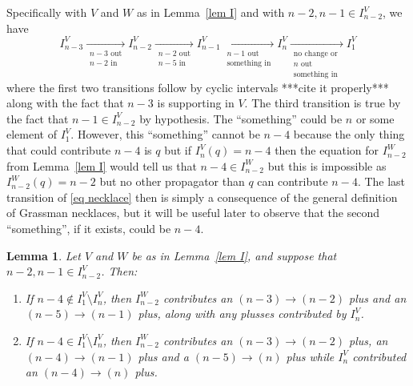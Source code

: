\documentclass[11pt]{article}
\newtheorem{lem}[thm]{Lemma}
\theoremstyle{remark}
\theoremstyle{definition}
\begin{document}
Specifically with $V$ and $W$ as in Lemma~\ref{lem I} and with $n-2, n-1\in I_{n-2}^V$, we have
  \begin{equation}\label{eq necklace}
  I_{n-3}^{V} \xrightarrow[\substack{n-3\text{ out}\\n-2\text{ in}}]{} I_{n-2}^{V} \xrightarrow[\substack{n-2\text{ out}\\n-5\text{ in}}]{} I_{n-1}^{V} \xrightarrow[\substack{n-1\text{ out}\\\text{something in}}]{} I_{n}^{V}  \xrightarrow[\substack{\text{no change or }\\n \text{ out}\\\text{something in}}]{} I_1^{V}
  \end{equation}
  where the first two transitions follow by cyclic intervals ***cite it properly*** along with the fact that $n-3$ is supporting in $V$.  The third transition is true by the fact that $n-1\in I_{n-2}^V$ by hypothesis.  The ``something'' could be $n$ or some element of $I_1^V$.  However, this ``something'' cannot be $n-4$ because the only thing that could contribute $n-4$ is $q$ but if $I_n^V(q)=n-4$ then the equation for $I_{n-2}^W$ from Lemma~\ref{lem I} would tell us that $n-4\in I_{n-2}^W$ but this is impossible as $I_{n-2}^W(q)=n-2$ but no other propagator than $q$ can contribute $n-4$. The last transition of \eqref{eq necklace} then is simply a consequence of the general definition of Grassman necklaces, but it will be useful later to observe that the second ``something'', if it exists, could be $n-4$.

  \begin{lem}\label{lem n-2 bad part 1}
Let $V$ and $W$ be as in Lemma~\ref{lem I}, and suppose that $n-2,n-1 \in I_{n-2}^{V}$. Then:
  \begin{enumerate}
  \item If $n-4 \not\in I_1^V\setminus I_n^V$, then $I_{n-2}^W$ contributes an $(n-3)\rightarrow (n-2)$ plus and an $(n-5)\rightarrow (n-1)$ plus, along with any plusses contributed by $I_n^V$.
  \item If $n-4 \in I_1^V\setminus I_n^V$, then $I_{n-2}^W$ contributes an $(n-3)\rightarrow (n-2)$ plus, an $(n-4)\rightarrow (n-1)$ plus and a $(n-5)\rightarrow (n)$ plus while $I_n^V$ contributed an $(n-4)\rightarrow (n)$ plus.
  \end{enumerate}
  \end{lem}
\end{document}
